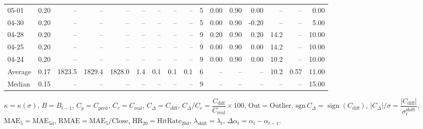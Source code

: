 \begin{threeparttable}
{\begin{tabular}{lrrrrrrrrrrrrrrr}
  05-01 &     0.20 &     -- &     -- &     -- &         -- &             -- &                       -- &                  -- &              5 &       0.00 &      0.90 &           0.00 &               -- &              -- &                   0.00 \\
  04-30 &     0.20 &     -- &     -- &     -- &         -- &             -- &                       -- &                  -- &              5 &       0.00 &      0.90 &          -0.20 &               -- &              -- &                   5.00 \\
  04-28 &     0.20 &     -- &     -- &     -- &         -- &             -- &                       -- &                  -- &              9 &       0.20 &      0.90 &           0.20 &             14.2 &              -- &                  10.00 \\
  04-25 &     0.20 &     -- &     -- &     -- &         -- &             -- &                       -- &                  -- &              9 &       0.00 &      0.90 &           0.00 &             14.2 &              -- &                  10.00 \\
  04-24 &     0.20 &     -- &     -- &     -- &         -- &             -- &                       -- &                  -- &              9 &       0.00 &      0.90 &           0.00 &             10.2 &              -- &                  10.00 \\
Average &     0.17 & 1823.5 & 1829.4 & 1828.0 &        1.4 &            0.1 &                      0.1 &                 0.1 &              6 &         -- &        -- &             -- &             10.2 &            0.57 &                  11.00 \\
 Median &     0.15 &     -- &     -- &     -- &         -- &             -- &                       -- &                  -- &              9 &         -- &        -- &             -- &               -- &              -- &                  15.00 \\
\bottomrule
\end{tabular}
}
\begin{tablenotes}\footnotesize
\item $\kappa=\kappa(\sigma)$, $B=B_{t-1}$, $C_p=C_{\text{pred}}$, $C_r=C_{\text{real}}$, $C_\Delta=C_{\text{diff}}$, $C_\Delta/C_r=\dfrac{C_{\text{diff}}}{C_{\text{real}}}\times100$, $\mathrm{Out}=\text{Outlier}$, $\mathrm{sgn}\,C_\Delta=\operatorname{sign}(C_{\text{diff}})$, $|C_\Delta|/\sigma=\dfrac{|C_{\text{diff}}|}{\sigma_t^{\text{shift}}}$, $\mathrm{MAE}_5=\mathrm{MAE}_{5\text{d}}$, $\mathrm{RMAE}= \mathrm{MAE}_5 / \text{Close}$, $\mathrm{HR}_{20}=\mathrm{HitRate}_{20\text{d}}$, 
$\lambda_{\text{shift}}=\lambda_t$, 
$\Delta\alpha_t=\alpha_t-\alpha_{t-1}$.
\end{tablenotes}
\end{threeparttable}
\endgroup

